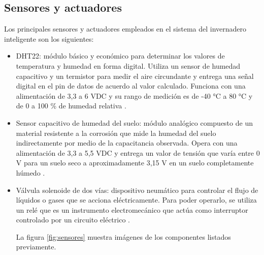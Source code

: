 %
\pagebreak

\subsection{Sensores y actuadores}
\label{sec:Sensores y actuadores}
Los principales sensores y actuadores empleados en el sistema del invernadero inteligente son los siguientes:
\begin{itemize}

\item DHT22: módulo básico y económico para determinar los valores de temperatura y humedad en forma digital. Utiliza un sensor de humedad capacitivo y un termistor para medir el aire circundante y entrega una señal digital en el pin de datos de acuerdo al valor calculado. Funciona con una alimentación de 3,3 a 6 VDC y su rango de medición es de -40 °C a 80 °C y de 0 a 100 \% de humedad relativa \citep{dht22}.

\item Sensor capacitivo de humedad del suelo: módulo analógico compuesto de un material resistente a la corrosión que mide la humedad del suelo indirectamente por medio de la capacitancia observada. Opera con una alimentación de 3,3 a 5,5 VDC y entrega un valor de tensión que varía entre 0 V para un suelo seco a aproximadamente 3,15 V en un suelo completamente húmedo \citep{soilsensor}.

\item Válvula solenoide de dos vías: dispositivo neumático para controlar el flujo de líquidos o gases que se acciona eléctricamente. Para poder operarlo, se utiliza un relé que es un instrumento electromecánico que actúa como interruptor controlado por un circuito eléctrico \citep{valve}\citep{rele}.

La figura \ref{fig:sensores} muestra imágenes de los componentes listados previamente.

\end{itemize}
%


